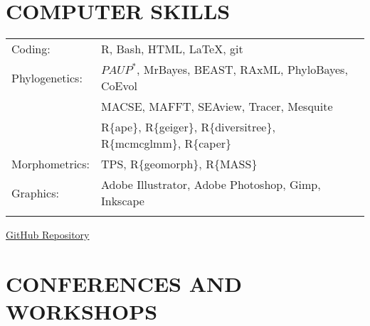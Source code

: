 \documentclass[10pt,a4paper]{article}
\begin{document}
{%
\section{COMPUTER SKILLS}
\begin{tabular}{ll}
Coding: & R, Bash, HTML, LaTeX, git\\[1.5ex]
Phylogenetics: & $PAUP^{*}$, MrBayes, BEAST, RAxML, PhyloBayes, CoEvol \\[1.5ex]
& MACSE, MAFFT, SEAview, Tracer, Mesquite\\
& R\{ape\}, R\{geiger\}, R\{diversitree\}, R\{mcmcglmm\}, R\{caper\} \\[1.5ex]
Morphometrics: & TPS, R\{geomorph\}, R\{MASS\} \\[1.5ex]
Graphics: & Adobe Illustrator, Adobe Photoshop, Gimp, Inkscape\\[1.5ex]
& \\
\end{tabular}
\href{https://github.com/TGuillerme?tab=repositories}{GitHub Repository}
\bigskip


\section{CONFERENCES AND WORKSHOPS}

}
\end{document}
